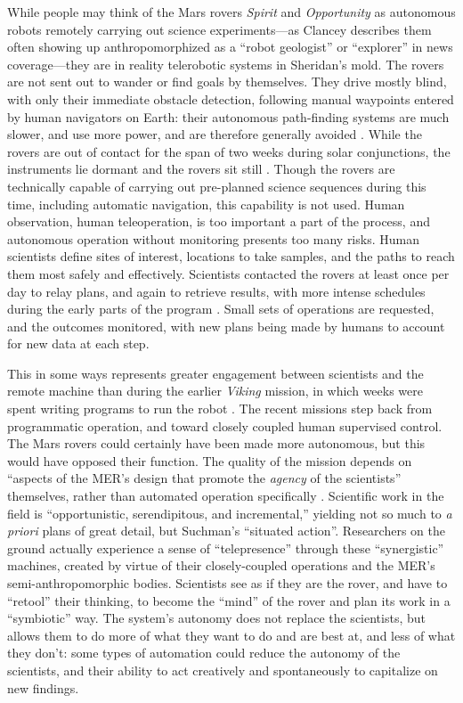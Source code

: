 While people may
think of the Mars rovers \emph{Spirit} and \emph{Opportunity} as
autonomous robots remotely carrying out science experiments---as
Clancey describes them often showing up anthropomorphized as a ``robot
geologist'' or 
``explorer'' in news coverage\cite[p. 7]{clancey}---they are
in reality telerobotic systems in Sheridan's mold. The rovers are not
sent out to wander or find goals by themselves. They drive mostly
blind, with only their immediate obstacle detection, following manual
waypoints entered by human navigators on Earth: their autonomous
path-finding systems are much slower, and use more power, and are
therefore generally avoided \cite[p. 118]{clancey}. While the rovers
are out of contact for the span of two weeks during solar
conjunctions, the instruments lie dormant and the rovers sit
still \cite[p. 25]{clancey}. Though the rovers are technically capable of
carrying out pre-planned science sequences during this time, including
automatic navigation, this capability is not used. Human observation,
human teleoperation, is too important a part of the process, and
autonomous operation without monitoring presents too many risks. Human
scientists define sites of interest, locations to take samples, and
the paths to reach them most safely and effectively. Scientists
contacted the rovers at least once per day to relay plans, and again
to retrieve results, with more intense schedules during the early
parts of the program \cite[p. 58]{clancey}. Small sets of
operations are requested, and the outcomes monitored, with new plans
being made by humans to account for new data at each step.

This in some ways
represents greater engagement between scientists and the remote
machine than during the earlier \emph{Viking} mission, in which weeks
were spent writing programs to run the robot \cite[p. 58]{clancey}.
The recent missions step back
from programmatic operation, and toward closely coupled human
supervised control. The Mars rovers could
certainly have been made more autonomous, but this would have opposed
their function. The quality of the mission depends on ``aspects of the
MER's design that promote the \emph{agency} of the scientists''
themselves, rather than automated operation specifically \cite[p.
  xii]{clancey}. Scientific work in the field is ``opportunistic, 
serendipitous, and incremental,''\cite[p. 32]{clancey} yielding
not so much to \emph{a priori}
plans of great detail, but Suchman's ``situated
action''\cite{suchmanSA}. Researchers on the ground actually
experience a sense of ``telepresence'' through these ``synergistic'' machines, created
by virtue of their closely-coupled operations and the MER's
semi-anthropomorphic bodies\cite[p. 55]{clancey}. Scientists see
as if they are the rover, and have to ``retool'' their thinking, to
become the ``mind'' of the rover and plan its work in a ``symbiotic''
way\cite[p. 106, 110, 118]{clancey}. The system's autonomy does not replace the
scientists, but allows them to do more of what they want to do and are
best at, and less of what they don't: some types of automation could reduce the
autonomy of the scientists, and their ability to act creatively and
spontaneously to capitalize on new findings\cite[p. 118-119]{clancey}. 

